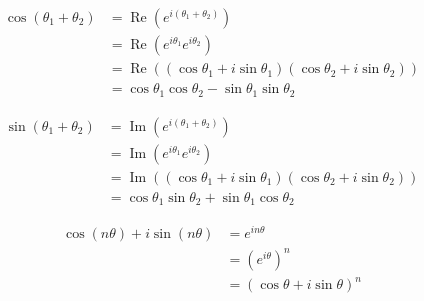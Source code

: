 \documentclass[twoside, a4paperpt, fleqn]{extarticle}
\begin{document}
    \begin{equation*}
        \begin{aligned}
            \cos \left(\theta_{1}+\theta_{2}\right) &=\operatorname{Re}\left(e^{i\left(\theta_{1}+\theta_{2}\right)}\right) \\
            &=\operatorname{Re}\left(e^{i \theta_{1}} e^{i \theta_{2}}\right) \\
            &=\operatorname{Re}\left(\left(\cos \theta_{1}+i \sin \theta_{1}\right)\left(\cos \theta_{2}+i \sin \theta_{2}\right)\right) \\
            &=\cos \theta_{1} \cos \theta_{2}-\sin \theta_{1} \sin \theta_{2}
        \end{aligned}
    \end{equation*}
        
    \begin{equation*}
        \begin{aligned}
            \sin \left(\theta_{1}+\theta_{2}\right) &=\operatorname{Im}\left(e^{i\left(\theta_{1}+\theta_{2}\right)}\right) \\
            &=\operatorname{Im}\left(e^{i \theta_{1}} e^{i \theta_{2}}\right) \\
            &=\operatorname{Im}\left(\left(\cos \theta_{1}+i \sin \theta_{1}\right)\left(\cos \theta_{2}+i \sin \theta_{2}\right)\right) \\
            &=\cos \theta_{1} \sin \theta_{2}+\sin \theta_{1} \cos \theta_{2}
        \end{aligned}
    \end{equation*}

    \begin{equation*}
        \begin{aligned}
        \cos (n \theta)+i \sin (n \theta) &=e^{i n \theta} \\
        &=\left(e^{i \theta}\right)^{n} \\
        &=(\cos \theta+i \sin \theta)^{n}
        \end{aligned}
        \end{equation*}
\end{document}
